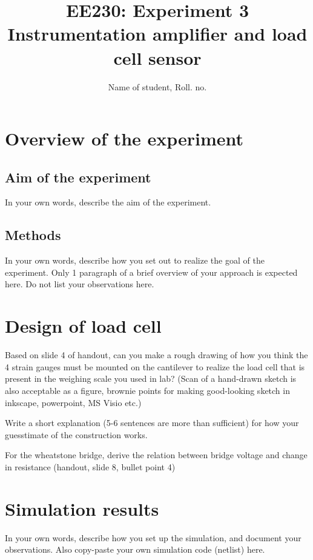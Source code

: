 ﻿\documentclass[12pt]{article}
\title{EE230: Experiment 3\\
Instrumentation amplifier and load cell sensor}
\author{Name of student, Roll. no.}
\begin{document}
\maketitle

\section{Overview of the experiment}

\subsection{Aim of the experiment}

In your own words, describe the aim of the experiment.

\subsection{Methods}

In your own words, describe how you set out to realize the goal of the experiment. Only 1 paragraph of a brief overview of your approach is expected here. Do not list your observations here.

\section{Design of load cell}

Based on slide 4 of handout, can you make a rough drawing of how you think the 4 strain gauges must be mounted on the cantilever to realize the load cell that is present in the weighing scale you used in lab? (Scan of a hand-drawn sketch is also acceptable as a figure, brownie points for making good-looking sketch in inkscape, powerpoint, MS Visio etc.)

Write a short explanation (5-6 sentences are more than sufficient) for how your guesstimate of the construction works.

For the wheatstone bridge, derive the relation between bridge voltage and change in resistance (handout, slide 8, bullet point 4)

\section{Simulation results}

In your own words, describe how you set up the simulation, and document your observations. Also copy-paste your own simulation code (netlist) here.
\end{document}
